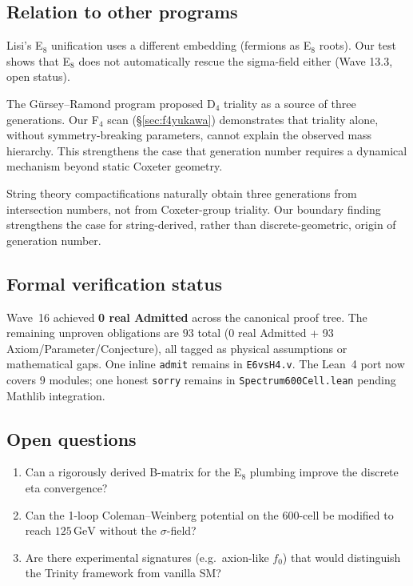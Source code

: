 \documentclass[11pt,a4paper]{article}
\theoremstyle{definition}
\begin{document}
\subsection{Relation to other programs}

Lisi's E$_8$ unification \cite{Lisi:2007} uses a different embedding
(fermions as E$_8$ roots). Our test shows that E$_8$ does not
automatically rescue the sigma-field either (Wave 13.3, open status).

The G\"{u}rsey--Ramond program \cite{Gursey:1975,Ramond:2001} proposed
D$_4$ triality as a source of three generations. Our F$_4$ scan
(\S\ref{sec:f4yukawa}) demonstrates that triality alone, without
symmetry-breaking parameters, cannot explain the observed mass hierarchy.
This strengthens the case that generation number requires a dynamical
mechanism beyond static Coxeter geometry.

String theory compactifications naturally obtain three generations from
intersection numbers, not from Coxeter-group triality. Our boundary finding
strengthens the case for string-derived, rather than discrete-geometric,
origin of generation number.

\subsection{Formal verification status}

Wave~16 achieved \textbf{0 real Admitted} across the canonical proof
tree. The remaining unproven obligations are $93$ total (0 real Admitted + 93 Axiom/Parameter/Conjecture), all tagged
as physical assumptions or mathematical gaps. One inline \texttt{admit}
remains in \texttt{E6vsH4.v}. The Lean~4 port now covers $9$ modules;
one honest \texttt{sorry} remains in \texttt{Spectrum600Cell.lean}
pending Mathlib integration.

\subsection{Open questions}

\begin{enumerate}
  \item Can a rigorously derived B-matrix for the E$_8$ plumbing improve
    the discrete eta convergence?
  \item Can the 1-loop Coleman--Weinberg potential on the 600-cell be
    modified to reach $125\,\text{GeV}$ without the $\sigma$-field?
  \item Are there experimental signatures (e.g.~axion-like $f_0$) that
    would distinguish the Trinity framework from vanilla SM?
\end{enumerate}
\end{document}
